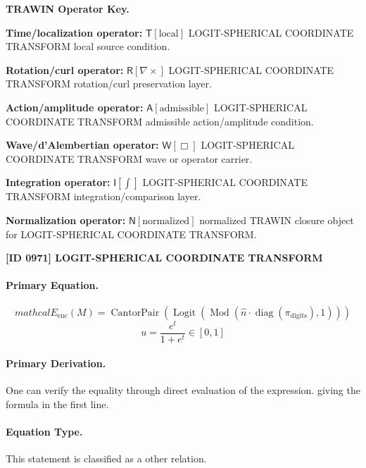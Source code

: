 \par\vspace{0.45\baselineskip}
\noindent\begin{minipage}[t]{\linewidth}
\begingroup
\small
\raggedright
\textbf{TRAWIN Operator Key.}\par
\noindent\textbf{Time/localization operator:} $\mathsf{T}\!\left[\mathrm{local}\right]$ LOGIT-SPHERICAL COORDINATE TRANSFORM local source condition.\par
\noindent\textbf{Rotation/curl operator:} $\mathsf{R}\!\left[\nabla\times\right]$ LOGIT-SPHERICAL COORDINATE TRANSFORM rotation/curl preservation layer.\par
\noindent\textbf{Action/amplitude operator:} $\mathsf{A}\!\left[\mathrm{admissible}\right]$ LOGIT-SPHERICAL COORDINATE TRANSFORM admissible action/amplitude condition.\par
\noindent\textbf{Wave/d'Alembertian operator:} $\mathsf{W}\!\left[\Box\right]$ LOGIT-SPHERICAL COORDINATE TRANSFORM wave or operator carrier.\par
\noindent\textbf{Integration operator:} $\mathsf{I}\!\left[\int\right]$ LOGIT-SPHERICAL COORDINATE TRANSFORM integration/comparison layer.\par
\noindent\textbf{Normalization operator:} $\mathsf{N}\!\left[\mathrm{normalized}\right]$ normalized TRAWIN closure object for LOGIT-SPHERICAL COORDINATE TRANSFORM.\par
\endgroup
\end{minipage}

\clearpage
\noindent\textbf{[ID 0971] LOGIT-SPHERICAL COORDINATE TRANSFORM}\par
\vspace{0.35em}
\paragraph{Primary Equation.}
\[
mathcal{E}_{\mathrm{enc}}(M)=\operatorname{CantorPair}\!\left(\operatorname{Logit}\!\left(\operatorname{Mod}\!\left(\widehat{n}\cdot \operatorname{diag}(\pi_{\mathrm{digits}}),1\right)\right)\right)
\]
\[
u=\frac{e^{t}}{1+e^{t}}\in[0,1]
\]

\paragraph{Primary Derivation.}
One can verify the equality through direct evaluation of the expression. giving the formula in the first line.
\paragraph{Equation Type.}
This statement is classified as a other relation.

